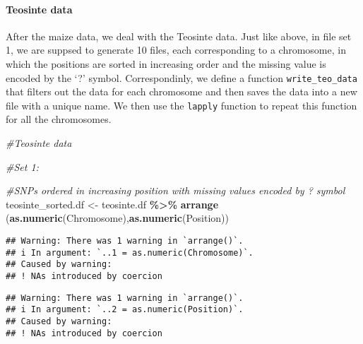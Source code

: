 \documentclass[
]{article}
\newenvironment{Shaded}{\begin{snugshade}}{\end{snugshade}}
\newcommand{\CommentTok}[1]{\textcolor[rgb]{0.56,0.35,0.01}{\textit{#1}}}
\newcommand{\FunctionTok}[1]{\textcolor[rgb]{0.13,0.29,0.53}{\textbf{#1}}}
\newcommand{\NormalTok}[1]{#1}
\newcommand{\OtherTok}[1]{\textcolor[rgb]{0.56,0.35,0.01}{#1}}
\newcommand{\SpecialCharTok}[1]{\textcolor[rgb]{0.81,0.36,0.00}{\textbf{#1}}}
\begin{document}
\paragraph{Teosinte data}\label{teosinte-data}

After the maize data, we deal with the Teosinte data. Just like above,
in file set 1, we are suppsed to generate 10 files, each corresponding
to a chromosome, in which the positions are sorted in increasing order
and the missing value is encoded by the `?' symbol. Correspondinly, we
define a function \texttt{write\_teo\_data} that filters out the data
for each chromosome and then saves the data into a new file with a
unique name. We then use the \texttt{lapply} function to repeat this
function for all the chromosomes.

\begin{Shaded}
\begin{Highlighting}[]
\CommentTok{\#Teosinte data}

\CommentTok{\#Set 1:}

\CommentTok{\#SNPs ordered in increasing position with missing values encoded by \textquotesingle{}?\textquotesingle{} symbol}
\NormalTok{teosinte\_sorted.df }\OtherTok{\textless{}{-}}\NormalTok{ teosinte.df }\SpecialCharTok{\%\textgreater{}\%}
  \FunctionTok{arrange}\NormalTok{ (}\FunctionTok{as.numeric}\NormalTok{(Chromosome),}\FunctionTok{as.numeric}\NormalTok{(Position))}
\end{Highlighting}
\end{Shaded}

\begin{verbatim}
## Warning: There was 1 warning in `arrange()`.
## i In argument: `..1 = as.numeric(Chromosome)`.
## Caused by warning:
## ! NAs introduced by coercion
\end{verbatim}

\begin{verbatim}
## Warning: There was 1 warning in `arrange()`.
## i In argument: `..2 = as.numeric(Position)`.
## Caused by warning:
## ! NAs introduced by coercion
\end{verbatim}
\end{document}

